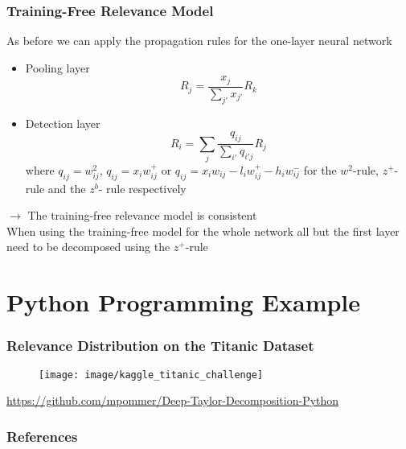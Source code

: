 \documentclass{beamer}
\begin{document}
\begin{frame}
\frametitle{Training-Free Relevance Model}
\vspace{0.25cm}
As before we can apply the propagation rules for the one-layer neural network
\begin{itemize}
\item Pooling layer
\begin{equation*}
R_j = \frac{x_j}{\sum_{j'} x_{j'}}R_k
\end{equation*}

\item Detection layer
\begin{equation*}
R_i = \sum_j \frac{q_{ij}}{\sum_{i'} q_{i'j}} R_j
\end{equation*}
where $q_{ij}= w_{ij}^2$, $q_{ij}= x_i w_{ij}^+$ or $q_{ij}= x_i w_{ij} - l_i w_{ij}^+ - h_i w_{ij}^-$ for the $w^2$-rule, $z^+$-rule and the $z^b$- rule respectively
\end{itemize}
\vspace{0.1cm}
$\rightarrow$ The training-free relevance model is consistent\\

\vspace{0.5cm}
When using the training-free model for the whole network all but the first layer need to be decomposed using the $z^+$-rule
\end{frame}


\section{Python Programming Example}

\begin{frame}
\frametitle{Relevance Distribution on the Titanic Dataset}
\vspace{0.5cm}
\begin{figure}
\texttt{[image: image/kaggle\_titanic\_challenge]}
\end{figure}
\vspace{0.25cm}
\url{https://github.com/mpommer/Deep-Taylor-Decomposition-Python}
\end{frame}


\begin{frame}[allowframebreaks]
\frametitle{References}
\printbibliography
\end{frame}
\end{document}
